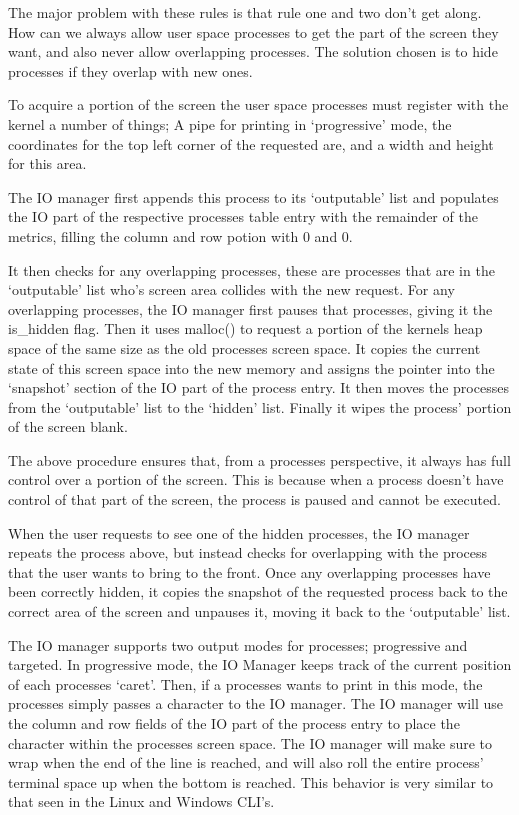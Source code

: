 \documentclass[a4paper]{report}
\begin{document}
The major problem with these rules is that rule one and two don't get along. How can we always allow user space processes to get the part of the screen they want, and also never allow overlapping processes. The solution chosen is to hide processes if they overlap with new ones.

To acquire a portion of the screen the user space processes must register with the kernel a number of things; A pipe for printing in `progressive' mode, the coordinates for the top left corner of the requested are, and a width and height for this area.

The IO manager first appends this process to its `outputable' list and populates the IO part of the respective processes table entry with the remainder of the metrics, filling the column and row potion with 0 and 0.

It then checks for any overlapping processes, these are processes that are in the `outputable' list who's screen area collides with the new request. For any overlapping processes, the IO manager first pauses that processes, giving it the is\_hidden flag. Then it uses malloc() to request a portion of the kernels heap space of the same size as the old processes screen space. It copies the current state of this screen space into the new memory and assigns the pointer into the `snapshot' section of the IO part of the process entry. It then moves the processes from the `outputable' list to the `hidden' list. Finally it wipes the process' portion of the screen blank.

The above procedure ensures that, from a processes perspective, it always has full control over a portion of the screen. This is because when a process doesn't have control of that part of the screen, the process is paused and cannot be executed.

When the user requests to see one of the hidden processes, the IO manager repeats the process above, but instead checks for overlapping with the process that the user wants to bring to the front. Once any overlapping processes have been correctly hidden, it copies the snapshot of the requested process back to the correct area of the screen and unpauses it, moving it back to the `outputable' list.

The IO manager supports two output modes for processes; progressive and targeted. In progressive mode, the  IO Manager keeps track of the current position of each processes `caret'. Then, if a processes wants to print in this mode, the processes simply passes a character to the IO manager. The IO manager will use the column and row fields of the IO part of the process entry to place the character within the processes screen space. The IO manager will make sure to wrap when the end of the line is reached, and will also roll the entire process' terminal space up when the bottom is reached. This behavior is very similar to that seen in the Linux and Windows CLI's.
\end{document}
